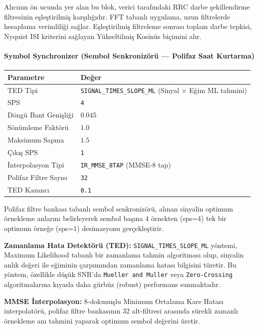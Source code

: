 \documentclass[
]{IEEEtran}
\newcounter{none} %
\begin{document}
Alıcının ön ucunda yer alan bu blok, verici tarafındaki RRC darbe
şekillendirme filtresinin eşleştirilmiş karşılığıdır. FFT tabanlı
uygulama, uzun filtrelerde hesaplama verimliliği sağlar. Eşleştirilmiş
filtreleme sonrası toplam darbe tepkisi, Nyquist ISI kriterini sağlayan
Yükseltilmiş Kosinüs biçimini alır.

\paragraph{Symbol Synchronizer (Sembol Senkronizörü --- Polifaz Saat
Kurtarma)}\label{symbol-synchronizer-sembol-senkronizuxf6ruxfc-polifaz-saat-kurtarma}

{\def\LTcaptype{none} %
\begin{longtable}[]{@{}ll@{}}
\toprule\noalign{}
Parametre & Değer \\
\midrule\noalign{}
\endhead
\bottomrule\noalign{}
\endlastfoot
TED Tipi & \texttt{SIGNAL\_TIMES\_SLOPE\_ML} (Sinyal × Eğim ML
tahmini) \\
SPS & \texttt{4} \\
Döngü Bant Genişliği & \(0.045\) \\
Sönümleme Faktörü & \(1.0\) \\
Maksimum Sapma & \(1.5\) \\
Çıkış SPS & \texttt{1} \\
İnterpolasyon Tipi & \texttt{IR\_MMSE\_8TAP} (MMSE-8 tap) \\
Polifaz Filtre Sayısı & \texttt{32} \\
TED Kazancı & \texttt{0.1} \\
\end{longtable}
}

Polifaz filtre bankası tabanlı sembol senkronizörü, alınan sinyalin
optimum örnekleme anlarını belirleyerek sembol başına 4 örnekten (sps=4)
tek bir optimum örneğe (sps=1) desimasyonu gerçekleştirir.

\textbf{Zamanlama Hata Detektörü (TED):}
\texttt{SIGNAL\_TIMES\_SLOPE\_ML} yöntemi, Maximum Likelihood tabanlı
bir zamanlama tahmin algoritması olup, sinyalin anlık değeri ile
eğiminin çarpımından zamanlama hatası bilgisini türetir. Bu yöntem,
özellikle düşük SNR'da \texttt{Mueller\ and\ Muller} veya
\texttt{Zero-Crossing} algoritmalarına kıyasla daha gürbüz (robust)
performans sunmaktadır.

\textbf{MMSE İnterpolasyon:} 8-dokunuşlu Minimum Ortalama Kare Hatası
interpolatörü, polifaz filtre bankasının 32 alt-filtresi arasında
sürekli zamanlı örnekleme anı tahmini yaparak optimum sembol değerini
üretir.
\end{document}
